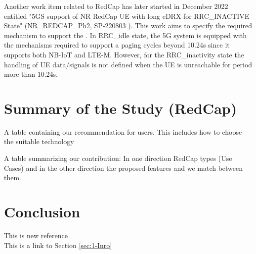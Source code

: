 \documentclass[conference]{IEEEtran}
\begin{document}
Another work item related to RedCap has later started in December 2022 entitled "5GS support of NR RedCap UE with long eDRX for RRC\_INACTIVE State" (NR\_REDCAP\_Ph2, SP-220803 \cite{3gpp_5gs_2022_SP-220803}). This work aims to specify the required mechanism to support the . In RRC\_idle state, the 5G system is equipped with the mechanisms required to support a paging cycles beyond 10.24s since it supports both NB-IoT and LTE-M. However, for the RRC\_inactivity state the handling of UE  data/signals is not defined when the UE is unreachable for period more than 10.24s.




\section{Summary of the Study (RedCap)}
\label{sec:7}


A table containing our recommendation for users. This includes how to choose the suitable technology 

A table summarizing our contribution: In one direction RedCap types (Use Cases) and in the other direction the proposed features and we match between them.
\cite{noauthor_5g_2020}

\section{Conclusion}
\label{sec:7-3}

This is new reference \cite{3gpp_study_2021_38.875}\\
This is a link to Section \ref{sec:1-Inro}



\end{document}
